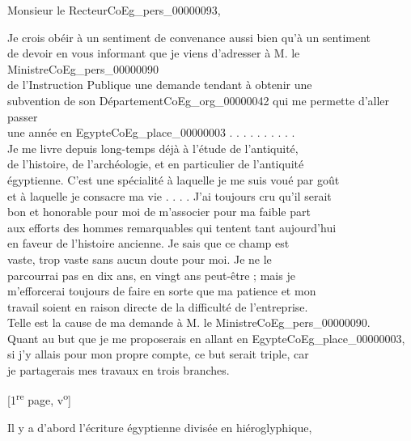 \documentclass{book}
\begin{document}
\hspace{1cm} Monsieur le Recteur\gls{CoEg_pers_00000093},\\
\par Je crois obéir à un sentiment de convenance aussi bien qu’à un sentiment\\
de devoir en vous informant que je viens d’adresser à M. le Ministre\gls{CoEg_pers_00000090}\\
de l’Instruction Publique une demande tendant à obtenir une\\
subvention de son Département\gls{CoEg_org_00000042} qui me permette d’aller passer\\
une année en Egypte\gls{CoEg_place_00000003} . . . . . . . . . .\\
\indent Je me livre depuis long-temps déjà à l’étude de l’antiquité,\\
de l’histoire, de l’archéologie, et en particulier de l’antiquité\\
égyptienne. C’est une spécialité à laquelle je me suis voué par goût\\
et à laquelle je consacre ma vie . . . . J’ai toujours cru qu’il serait\\
bon et honorable pour moi de m’associer pour ma faible part\\
aux efforts des hommes remarquables qui tentent tant aujourd’hui\\
en faveur de l’histoire ancienne. Je sais que ce champ est\\
vaste, trop vaste sans aucun doute pour moi. Je ne le\\
parcourrai pas en dix ans, en vingt ans peut-être ; mais je\\
m’efforcerai toujours de faire en sorte que ma patience et mon\\
travail soient en raison directe de la difficulté de l’entreprise.\\
Telle est la cause de ma demande à M. le Ministre\gls{CoEg_pers_00000090}.\\
\indent Quant au but que je me proposerais en allant en Egypte\gls{CoEg_place_00000003},\\
si j’y allais pour mon propre compte, ce but serait triple, car\\
je partagerais mes travaux en trois branches.
{\footnotesize \begin{center} {[1\textsuperscript{re} page, v\textsuperscript{o}]}\end{center}}
\indent Il y a d’abord l’écriture égyptienne divisée en hiéroglyphique,\\
\end{document}
